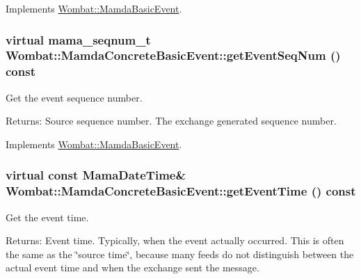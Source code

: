 Implements \hyperlink{classWombat_1_1MamdaBasicEvent_94e531c6ae9ae7798725db14facbd6e2}{Wombat::Mamda\-Basic\-Event}.\hypertarget{classWombat_1_1MamdaConcreteBasicEvent_f77bc954633096ff731212ed5b86c3a7}{
\subsubsection[getEventSeqNum]{\setlength{\rightskip}{0pt plus 5cm}virtual mama\_\-seqnum\_\-t Wombat::Mamda\-Concrete\-Basic\-Event::get\-Event\-Seq\-Num () const}}
\label{classWombat_1_1MamdaConcreteBasicEvent_f77bc954633096ff731212ed5b86c3a7}


Get the event sequence number. 

\begin{Desc}
\item[Returns:]Source sequence number. The exchange generated sequence number. \end{Desc}


Implements \hyperlink{classWombat_1_1MamdaBasicEvent_1fd845d48e95b4ee3beafc72d1ac2adf}{Wombat::Mamda\-Basic\-Event}.\hypertarget{classWombat_1_1MamdaConcreteBasicEvent_887c69f7d9259d62ae323ddc3706ac44}{
\subsubsection[getEventTime]{\setlength{\rightskip}{0pt plus 5cm}virtual const Mama\-Date\-Time\& Wombat::Mamda\-Concrete\-Basic\-Event::get\-Event\-Time () const}}
\label{classWombat_1_1MamdaConcreteBasicEvent_887c69f7d9259d62ae323ddc3706ac44}


Get the event time. 

\begin{Desc}
\item[Returns:]Event time. Typically, when the event actually occurred. This is often the same as the \char`\"{}source time\char`\"{}, because many feeds do not distinguish between the actual event time and when the exchange sent the message. \end{Desc}


